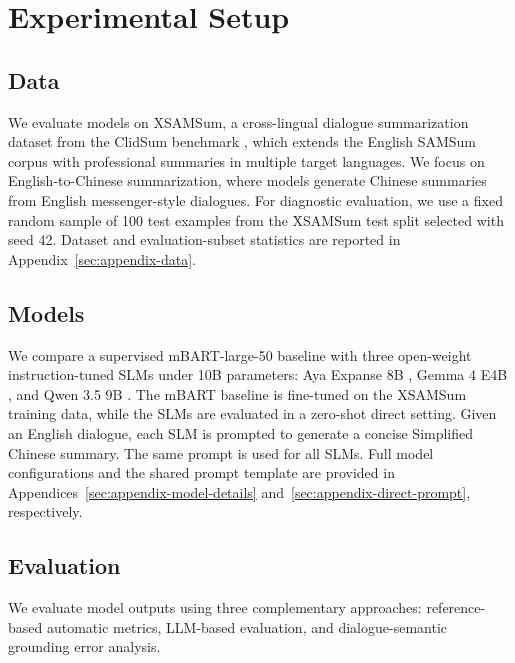 \documentclass[11pt]{article}
\begin{document}
\section{Experimental Setup}
\subsection{Data}

We evaluate models on XSAMSum, a cross-lingual dialogue summarization dataset from the ClidSum benchmark \citep{wang-etal-2022-clidsum}, which extends the English SAMSum corpus \citep{gliwa-etal-2019-samsum} with professional summaries in multiple target languages. We focus on English-to-Chinese summarization, where models generate Chinese summaries from English messenger-style dialogues. For diagnostic evaluation, we use a fixed random sample of 100 test examples from the XSAMSum test split selected with seed 42. Dataset and evaluation-subset statistics are reported in Appendix~\ref{sec:appendix-data}.


\subsection{Models}

We compare a supervised mBART-large-50 baseline \citep{liu-etal-2020-multilingual-denoising,tang-etal-2021-multilingual} with three open-weight instruction-tuned SLMs under 10B parameters: Aya Expanse 8B \citep{dang2024ayaexpansecombiningresearch}, Gemma 4 E4B \citep{gemma4_2026}, and Qwen 3.5 9B \citep{qwenteam2026qwen35omnitechnicalreport}. The mBART baseline is fine-tuned on the XSAMSum training data, while the SLMs are evaluated in a zero-shot direct setting. Given an English dialogue, each SLM is prompted to generate a concise Simplified Chinese summary. The same prompt is used for all SLMs. Full model configurations and the shared prompt template are provided in Appendices~\ref{sec:appendix-model-details} and~\ref{sec:appendix-direct-prompt}, respectively.

\subsection{Evaluation}
We evaluate model outputs using three complementary approaches: reference-based automatic metrics, LLM-based evaluation, and dialogue-semantic grounding error analysis.
\end{document}
